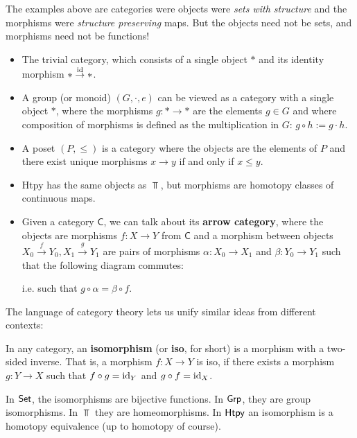 \begin{ex}[]
  The examples above are categories were objects were \emph{sets with structure} and the morphisms were \emph{structure preserving} maps.
  But the objects need not be sets, and morphisms need not be functions!
\begin{itemize}
  \item The trivial category, which consists of a single object $\ast$ and its identity morphism $\ast \stackrel{\operatorname{id}}{\to} \ast$.
  \item A group (or monoid) $(G,\cdot,e)$ can be viewed as a category with a single object $\ast$, where the morphisms $g: \ast \to \ast$ are the elements $g \in G$ and where composition of morphisms is defined as the multiplication in $G$: $g \circ h := g \cdot h$.
  \item A poset $(P,\leq)$ is a category where the objects are the elements of $P$ and there exist unique morphisms $x \to y$ if and only if $x \leq y$.
  \item \textsf{Htpy} has the same objects as $\Top$, but morphisms are homotopy classes of continuous maps.
  \item Given a category $\textsf{C}$, we can talk about its \textbf{arrow category}, where the objects are morphisms $f: X \to Y$ from $\textsf{C}$ and a morphism between objects $X_0 \stackrel{f}{\to} Y_0, X_1 \stackrel{g}{\to}Y_1$ are pairs of morphisms $\alpha: X_0 \to X_1$ and $\beta: Y_0 \to Y_1$ such that the following diagram commutes:
    \begin{center}
    \end{center}
    i.e. such that $g \circ \alpha = \beta \circ f$.
\end{itemize}
\end{ex}

The language of category theory lets us unify similar ideas from different contexts:
\begin{dfn}[]\label{dfn:cat-iso}
  In any category, an \textbf{isomorphism} (or \textbf{iso}, for short) is a morphism with a two-sided inverse.
That is, a morphism $f: X \to Y$ is iso, if there exists a morphism $g: Y \to X$ such that $f \circ g = \operatorname{id}_Y$ and $g \circ f = \operatorname{id}_X$.
\end{dfn}
In $\text{\sffamily Set}$, the isomorphisms are bijective functions. In $\text{\sffamily Grp}$, they are group isomorphisms. In $\Top$ they are homeomorphisms. In $\text{\sffamily Htpy}$ an isomorphism is a homotopy equivalence (up to homotopy of course).

